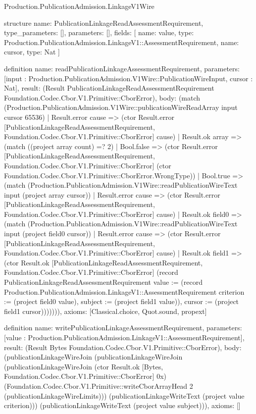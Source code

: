 \begin{lexlean}{Production.PublicationAdmission.LinkageV1Wire}
\begin{semanticmodule}
structure{
  name: PublicationLinkageReadAssessmentRequirement,
  type_parameters: [],
  parameters: [],
  fields: [
    {name: value, type: Production.PublicationAdmission.LinkageV1::AssessmentRequirement},
    {name: cursor, type: Nat}
  ]
}

definition{
  name: readPublicationLinkageAssessmentRequirement,
  parameters: [input : Production.PublicationAdmission.V1Wire::PublicationWireInput, cursor : Nat],
  result: (Result PublicationLinkageReadAssessmentRequirement Foundation.Codec.Cbor.V1.Primitive::CborError),
  body: (match (Production.PublicationAdmission.V1Wire::publicationWireReadArray input cursor 65536)
    | Result.error cause => (ctor Result.error [PublicationLinkageReadAssessmentRequirement, Foundation.Codec.Cbor.V1.Primitive::CborError] cause)
    | Result.ok array => (match ((project array count) =? 2)
      | Bool.false => (ctor Result.error [PublicationLinkageReadAssessmentRequirement, Foundation.Codec.Cbor.V1.Primitive::CborError] (ctor Foundation.Codec.Cbor.V1.Primitive::CborError.WrongType))
      | Bool.true => (match (Production.PublicationAdmission.V1Wire::readPublicationWireText input (project array cursor))
        | Result.error cause => (ctor Result.error [PublicationLinkageReadAssessmentRequirement, Foundation.Codec.Cbor.V1.Primitive::CborError] cause)
        | Result.ok field0 => (match (Production.PublicationAdmission.V1Wire::readPublicationWireText input (project field0 cursor))
          | Result.error cause => (ctor Result.error [PublicationLinkageReadAssessmentRequirement, Foundation.Codec.Cbor.V1.Primitive::CborError] cause)
          | Result.ok field1 => (ctor Result.ok [PublicationLinkageReadAssessmentRequirement, Foundation.Codec.Cbor.V1.Primitive::CborError] (record PublicationLinkageReadAssessmentRequirement {value := (record Production.PublicationAdmission.LinkageV1::AssessmentRequirement {criterion := (project field0 value), subject := (project field1 value)}), cursor := (project field1 cursor)})))))),
  axioms: [Classical.choice, Quot.sound, propext]
}

definition{
  name: writePublicationLinkageAssessmentRequirement,
  parameters: [value : Production.PublicationAdmission.LinkageV1::AssessmentRequirement],
  result: (Result Bytes Foundation.Codec.Cbor.V1.Primitive::CborError),
  body: (publicationLinkageWireJoin (publicationLinkageWireJoin (publicationLinkageWireJoin (ctor Result.ok [Bytes, Foundation.Codec.Cbor.V1.Primitive::CborError] 0x) (Foundation.Codec.Cbor.V1.Primitive::writeCborArrayHead 2 (publicationLinkageWireLimits))) (publicationLinkageWriteText (project value criterion))) (publicationLinkageWriteText (project value subject))),
  axioms: []
}


\end{semanticmodule}
\end{lexlean}
